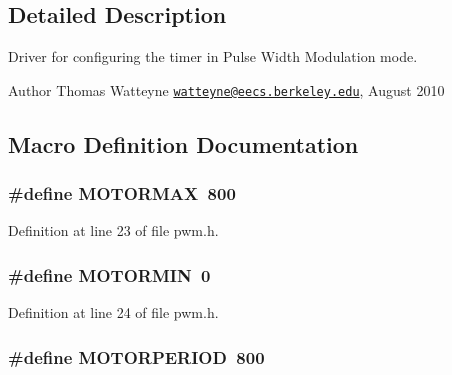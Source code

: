 \subsection{Detailed Description}
Driver for configuring the timer in Pulse Width Modulation mode. 

\begin{DoxyAuthor}{Author}
Thomas Watteyne \href{mailto:watteyne@eecs.berkeley.edu}{\tt watteyne@eecs.\+berkeley.\+edu}, August 2010 
\end{DoxyAuthor}


\subsection{Macro Definition Documentation}
\subsubsection[{\texorpdfstring{M\+O\+T\+O\+R\+M\+AX}{MOTORMAX}}]{\setlength{\rightskip}{0pt plus 5cm}\#define M\+O\+T\+O\+R\+M\+AX~800}\hypertarget{group___p_w_m_gae1c41fe7d060099ebab9cee16893eac0}{}\label{group___p_w_m_gae1c41fe7d060099ebab9cee16893eac0}


Definition at line 23 of file pwm.\+h.

\subsubsection[{\texorpdfstring{M\+O\+T\+O\+R\+M\+IN}{MOTORMIN}}]{\setlength{\rightskip}{0pt plus 5cm}\#define M\+O\+T\+O\+R\+M\+IN~0}\hypertarget{group___p_w_m_ga1f92d617a268ea424ebbd4e964ed2c7a}{}\label{group___p_w_m_ga1f92d617a268ea424ebbd4e964ed2c7a}


Definition at line 24 of file pwm.\+h.

\subsubsection[{\texorpdfstring{M\+O\+T\+O\+R\+P\+E\+R\+I\+OD}{MOTORPERIOD}}]{\setlength{\rightskip}{0pt plus 5cm}\#define M\+O\+T\+O\+R\+P\+E\+R\+I\+OD~800}\hypertarget{group___p_w_m_gaeee77a1eb6566203ee0ff9f73793eef0}{}\label{group___p_w_m_gaeee77a1eb6566203ee0ff9f73793eef0}


